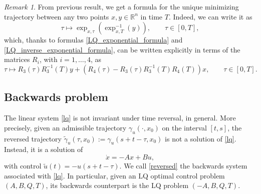 \documentclass[reqno]{amsart}
\theoremstyle{plain}
\theoremstyle{definition}
\newtheorem{Def}[thm]{Definition}
\theoremstyle{remark}
\newtheorem{rem}[thm]{Remark}
\newcommand{\R}{\mathbb{R}}
\newcommand{\blue}{\color{blue}}
\begin{document}
    \begin{rem}\label{formula_opt_traj}
	From previous result, we get a formula for the unique minimizing trajectory between any two points $x,y\in\mathbb{R}^n$ in time $T$. Indeed, we can write it as
	\begin{equation}
		\tau\mapsto\exp_{x,\tau}(\exp_{x,T}^{-1}(y)),\qquad \tau\in[0,T],
	\end{equation}
	which, thanks to formulas \eqref{LQ_exponential_formula} and \eqref{LQ_inverse_exponential_formula}, can be written explicitly in terms of the matrices $R_i$, with $i=1,\ldots,4$, as
	\begin{equation}
		\tau\mapsto R_3(\tau)R_3^{-1}(T)y+\left(R_4(\tau)-R_3(\tau)R_3^{-1}(T)R_4(T)\right)x,\qquad \tau\in[0,T].
	\end{equation}
		\end{rem}


\subsection{Backwards problem}

    The linear system \eqref{lq} is not invariant under time reversal, in general. More precisely, given an admissible trajectory $\gamma_u(\cdot, x_0)$ on the interval $[t,s]$, the reversed trajectory $\tilde{\gamma}_u(\tau,x_0):=\gamma_u(s+t-\tau,x_0)$ is not a solution of \eqref{lq}. Instead, it is a solution of
			\begin{equation}\label{reversed}
				\dot{x}=-Ax+Bu,
			\end{equation}
    with control $\tilde{u}(t)=-u(s+t-\tau)$. We call \eqref{reversed} the backwards system associated with \eqref{lq}. In particular, given an LQ optimal control problem $(A,B,Q,T)$, its backwards counterpart is the LQ problem $(-A,B,Q,T)$.
\end{document}
